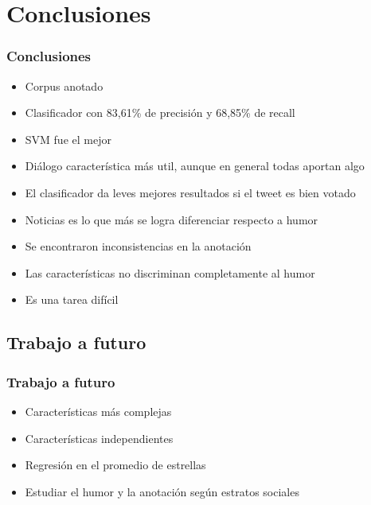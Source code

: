 \section{Conclusiones}

\begin{frame}
    \frametitle{Conclusiones}
    
    \begin{itemize}[<+->]
    	\item[\checkmark] Corpus anotado
    	\item[\checkmark] Clasificador con 83,61\% de precisión y 68,85\% de recall
    	\item[\checkmark] SVM fue el mejor
    	\item[\checkmark] Diálogo característica más util, aunque en general todas aportan algo
    	\item[\checkmark] El clasificador da leves mejores resultados si el tweet es bien votado
    	\item[\checkmark] Noticias es lo que más se logra diferenciar respecto a humor
    	\item[\checkmark] Se encontraron inconsistencias en la anotación
    	\item[\checkmark] Las características no discriminan completamente al humor
    	\item[\checkmark] Es una tarea difícil
    \end{itemize}
\end{frame}

\subsection{Trabajo a futuro}
\begin{frame}
    \frametitle{Trabajo a futuro}
    
    \begin{itemize}[<+->]
    	\item Características más complejas
    	\item Características independientes
    	\item Regresión en el promedio de estrellas
    	\item Estudiar el humor y la anotación según estratos sociales
    \end{itemize}
\end{frame}
